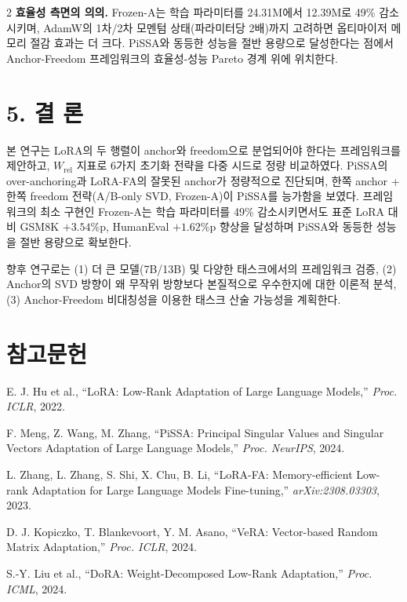 \documentclass[a4paper,10pt]{article}
\begin{document}
\begin{multicols}{2}
\textbf{효율성 측면의 의의.} Frozen-A는 학습 파라미터를 24.31M에서 12.39M로 49\% 감소시키며, AdamW의 1차/2차 모멘텀 상태(파라미터당 2배)까지 고려하면 옵티마이저 메모리 절감 효과는 더 크다. PiSSA와 동등한 성능을 절반 용량으로 달성한다는 점에서 Anchor-Freedom 프레임워크의 효율성-성능 Pareto 경계 위에 위치한다.

\section*{5. 결 론}

본 연구는 LoRA의 두 행렬이 anchor와 freedom으로 분업되어야 한다는 프레임워크를 제안하고, $W_{\text{rel}}$ 지표로 6가지 초기화 전략을 다중 시드로 정량 비교하였다. PiSSA의 over-anchoring과 LoRA-FA의 잘못된 anchor가 정량적으로 진단되며, 한쪽 anchor + 한쪽 freedom 전략(A/B-only SVD, Frozen-A)이 PiSSA를 능가함을 보였다. 프레임워크의 최소 구현인 Frozen-A는 학습 파라미터를 49\% 감소시키면서도 표준 LoRA 대비 GSM8K $+3.54$\%p, HumanEval $+1.62$\%p 향상을 달성하며 PiSSA와 동등한 성능을 절반 용량으로 확보한다.

향후 연구로는 (1) 더 큰 모델(7B/13B) 및 다양한 태스크에서의 프레임워크 검증, (2) Anchor의 SVD 방향이 왜 무작위 방향보다 본질적으로 우수한지에 대한 이론적 분석, (3) Anchor-Freedom 비대칭성을 이용한 태스크 산술 가능성을 계획한다.

\section*{참고문헌}

\begin{small}
\noindent
[1] E. J. Hu et al., ``LoRA: Low-Rank Adaptation of Large Language Models,'' \textit{Proc. ICLR}, 2022.

\noindent
[2] F. Meng, Z. Wang, M. Zhang, ``PiSSA: Principal Singular Values and Singular Vectors Adaptation of Large Language Models,'' \textit{Proc. NeurIPS}, 2024.

\noindent
[3] L. Zhang, L. Zhang, S. Shi, X. Chu, B. Li, ``LoRA-FA: Memory-efficient Low-rank Adaptation for Large Language Models Fine-tuning,'' \textit{arXiv:2308.03303}, 2023.

\noindent
[4] D. J. Kopiczko, T. Blankevoort, Y. M. Asano, ``VeRA: Vector-based Random Matrix Adaptation,'' \textit{Proc. ICLR}, 2024.

\noindent
[5] S.-Y. Liu et al., ``DoRA: Weight-Decomposed Low-Rank Adaptation,'' \textit{Proc. ICML}, 2024.


\end{small}
\end{multicols}
\end{document}

